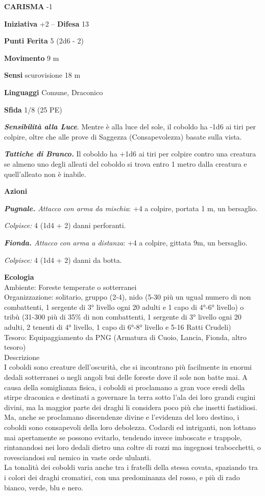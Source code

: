 \begin{multicols}{2}
\textbf{CARISMA} -1

\textbf{Iniziativa} +2 -- \textbf{Difesa} 13

\textbf{Punti Ferita} 5 (2d6 - 2)

\textbf{Movimento} 9 m

\textbf{Sensi} scurovisione 18 m

\textbf{Linguaggi} Comune, Draconico

\textbf{Sfida} 1/8 (25 PE)

\emph{\textbf{Sensibilità alla Luce}}. Mentre è alla luce del sole, il coboldo ha -1d6 ai tiri per colpire, oltre che alle prove di Saggezza (Consapevolezza) basate sulla vista.

\emph{\textbf{Tattiche di Branco.}} Il coboldo ha +1d6 ai tiri per colpire contro una creatura se almeno uno degli alleati del coboldo si trova entro 1 metro dalla creatura e quell'alleato non è inabile.

\textbf{Azioni}

\emph{\textbf{Pugnale.} Attacco con arma da mischia}: +4 a colpire,
portata 1 m, un bersaglio.

\emph{Colpisce:} 4 (1d4 + 2) danni perforanti.

\emph{\textbf{Fionda.} Attacco con arma a distanza}: +4 a colpire, gittata 9m, un bersaglio.

\emph{Colpisce:} 4 (1d4 + 2) danni da botta.

\textbf{Ecologia}\\
Ambiente: Foreste temperate o sotterranei\\
Organizzazione: solitario, gruppo (2-4), nido (5-30 più un ugual numero di non combattenti, 1 sergente di 3° livello ogni 20 adulti e 1 capo di 4°-6° livello) o tribù (31-300 più di 35\% di non combattenti, 1 sergente di 3° livello ogni 20 adulti, 2 tenenti di 4° livello, 1 capo di 6°-8° livello e 5-16 Ratti Crudeli)\\
Tesoro: Equipaggiamento da PNG (Armatura di Cuoio, Lancia, Fionda, altro tesoro)\\
Descrizione\\
I coboldi sono creature dell'oscurità, che si incontrano più facilmente in enormi dedali sotterranei o negli angoli bui delle foreste dove il sole non batte mai. A causa della somiglianza fisica, i coboldi si proclamano a gran voce eredi della stirpe draconica e destinati a governare la terra sotto l'ala dei loro grandi cugini divini, ma la maggior parte dei draghi li considera poco più che insetti fastidiosi. Ma, anche se proclamano discendenze divine e l'evidenza del loro destino, i coboldi sono consapevoli della loro debolezza. Codardi ed intriganti, non lottano mai apertamente se possono evitarlo, tendendo invece imboscate e trappole, rintanandosi nei loro dedali dietro una coltre di rozzi ma ingegnosi trabocchetti, o rovesciandosi sul nemico in vaste orde ululanti.\\
La tonalità dei coboldi varia anche tra i fratelli della stessa covata, spaziando tra i colori dei draghi cromatici, con una predominanza del rosso, e più di rado bianco, verde, blu e nero.\\



\end{multicols}
